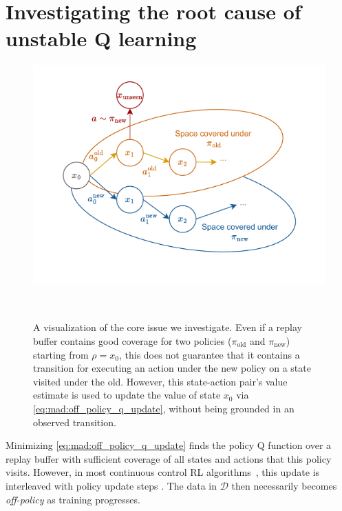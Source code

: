 \section{Investigating the root cause of unstable Q learning}


\begin{figure}[t]
\begin{minipage}{0.6\textwidth}
    \includegraphics[width=\textwidth]{illustrations/thesis_mad_overview.pdf}
\end{minipage}
~
\begin{minipage}{0.39\textwidth}
    \caption{A visualization of the core issue we investigate. Even if a replay buffer contains good coverage for two policies ($\pi_\mathrm{old}$ and $\pi_\mathrm{new}$) starting from $\rho=x_0$, this does not guarantee that it contains a transition for executing an action under the new policy on a state visited under the old. However, this state-action pair's value estimate is used to update the value of state $x_0$ via \autoref{eq:mad:off_policy_q_update}, without being grounded in an observed transition.}
    \label{fig:mad:coverage}
\end{minipage}
\end{figure}
    

Minimizing \autoref{eq:mad:off_policy_q_update} finds the policy Q function over a replay buffer with sufficient coverage of all states and actions that this policy visits.
However, in most continuous control RL algorithms~\parencite{ddpg,sac, fujimoto2018addressing}, this update is interleaved with policy update steps .
The data in $\mathcal{D}$ then necessarily becomes \emph{off-policy} as training progresses. 

